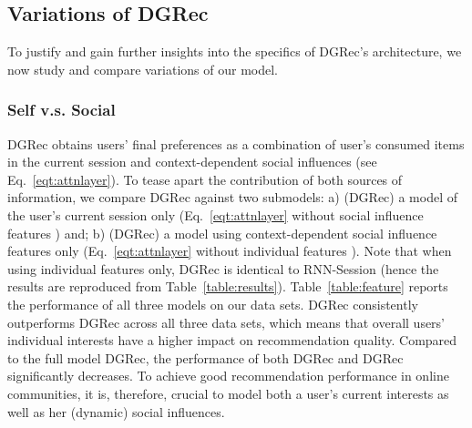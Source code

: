 \documentclass[sigconf]{acmart}
\begin{document}
\subsection{Variations of \gls{DGRec}}
To justify and gain further insights into the specifics of \gls{DGRec}'s architecture, we now study and compare variations of our model. 
\subsubsection{Self v.s. Social} \gls{DGRec} obtains users' final preferences as a combination of user's consumed items in the current session and context-dependent social influences (see Eq.\ \ref{eqt:attnlayer}). To tease apart the contribution of both sources of information, we compare \gls{DGRec} against two submodels:
a) (\gls{DGRec}) a model of the user's current session only (Eq.\ \ref{eqt:attnlayer} without social influence features ) and; b) (\gls{DGRec}) a model using context-dependent social influence features only (Eq.\ \ref{eqt:attnlayer} without individual features ). Note that when using individual features only, \gls{DGRec} is identical to RNN-Session (hence the results are reproduced from Table~\ref{table:results}).
Table~\ref{table:feature} reports the performance of all three models on our data sets.
\gls{DGRec} consistently outperforms \gls{DGRec} across all three data sets, which means that overall users' individual interests have a higher impact on recommendation quality.
Compared to the full model \gls{DGRec}, the performance of both \gls{DGRec} and \gls{DGRec} significantly decreases. To achieve good recommendation performance in online communities, it is, therefore, crucial to model both a user's current interests as well as her (dynamic) social influences.
\end{document}
